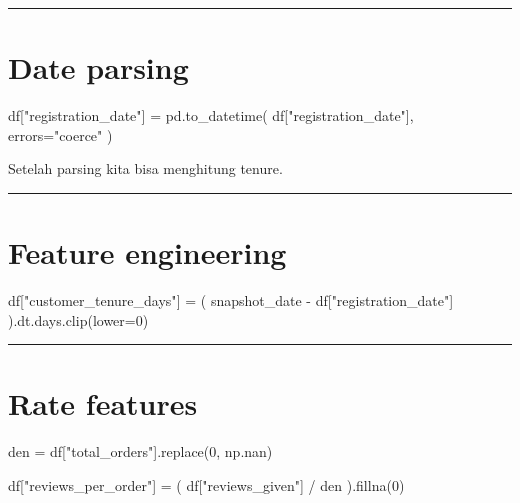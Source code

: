 \documentclass[
  indonesian,
  letterpaper,
  DIV=11,
  numbers=noendperiod]{scrreprt}
\newenvironment{Shaded}{\begin{snugshade}}{\end{snugshade}}
\newcommand{\DecValTok}[1]{\textcolor[rgb]{0.68,0.00,0.00}{#1}}
\newcommand{\NormalTok}[1]{\textcolor[rgb]{0.00,0.23,0.31}{#1}}
\newcommand{\OperatorTok}[1]{\textcolor[rgb]{0.37,0.37,0.37}{#1}}
\newcommand{\StringTok}[1]{\textcolor[rgb]{0.13,0.47,0.30}{#1}}
\begin{document}
\begin{center}\rule{0.5\linewidth}{0.5pt}\end{center}

\section{Date parsing}\label{date-parsing}

\begin{Shaded}
\begin{Highlighting}[]
\NormalTok{df[}\StringTok{"registration\_date"}\NormalTok{] }\OperatorTok{=}\NormalTok{ pd.to\_datetime(}
\NormalTok{    df[}\StringTok{"registration\_date"}\NormalTok{],}
\NormalTok{    errors}\OperatorTok{=}\StringTok{"coerce"}
\NormalTok{)}
\end{Highlighting}
\end{Shaded}

Setelah parsing kita bisa menghitung tenure.

\begin{center}\rule{0.5\linewidth}{0.5pt}\end{center}

\section{Feature engineering}\label{feature-engineering}

\begin{Shaded}
\begin{Highlighting}[]
\NormalTok{df[}\StringTok{"customer\_tenure\_days"}\NormalTok{] }\OperatorTok{=}\NormalTok{ (}
\NormalTok{    snapshot\_date }\OperatorTok{{-}}\NormalTok{ df[}\StringTok{"registration\_date"}\NormalTok{]}
\NormalTok{).dt.days.clip(lower}\OperatorTok{=}\DecValTok{0}\NormalTok{)}
\end{Highlighting}
\end{Shaded}

\begin{center}\rule{0.5\linewidth}{0.5pt}\end{center}

\section{Rate features}\label{rate-features}

\begin{Shaded}
\begin{Highlighting}[]
\NormalTok{den }\OperatorTok{=}\NormalTok{ df[}\StringTok{"total\_orders"}\NormalTok{].replace(}\DecValTok{0}\NormalTok{, np.nan)}

\NormalTok{df[}\StringTok{"reviews\_per\_order"}\NormalTok{] }\OperatorTok{=}\NormalTok{ (}
\NormalTok{    df[}\StringTok{"reviews\_given"}\NormalTok{] }\OperatorTok{/}\NormalTok{ den}
\NormalTok{).fillna(}\DecValTok{0}\NormalTok{)}
\end{Highlighting}
\end{Shaded}
\end{document}
